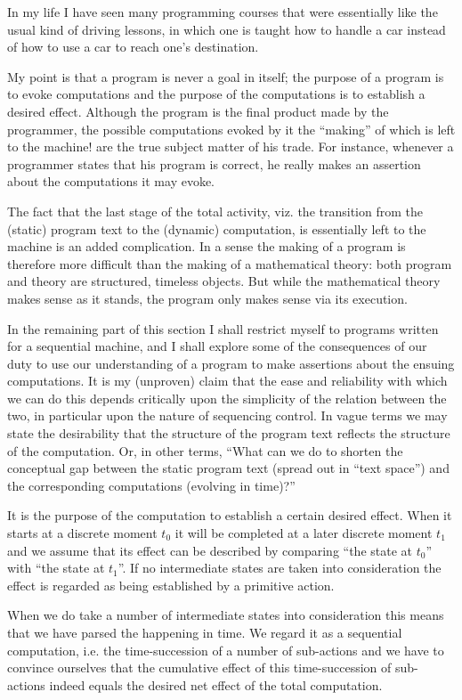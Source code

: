 In my life I have seen many programming courses that were essentially like the usual kind of driving lessons, in which one is taught how to handle a car
instead of how to use a car to reach one's destination.

My point is that a program is never a goal in itself; the purpose of a program is to evoke computations and the purpose of the computations is to establish a desired effect. Although the program is the final product made by the programmer, the possible computations evoked by it \textemdash{}  the ``making'' of which is left to the machine! \textemdash{}  are the true subject matter of his trade. For instance, whenever a programmer states that his program is correct, he really makes an assertion about the computations it may evoke.

The fact that the last stage of the total activity, viz. the transition from the (static) program text to the (dynamic) computation, is essentially left to the machine is an added complication. In a sense the making of a program is therefore more difficult than the making of a mathematical theory: both program and theory are structured, timeless objects. But while the mathematical theory makes sense as it stands, the program only makes sense via its execution.

In the remaining part of this section I shall restrict myself to programs written for a sequential machine, and I shall explore some of the consequences of our duty to use our understanding of a program to make assertions about the ensuing computations. It is my (unproven) claim that the ease and reliability with which we can do this depends critically upon the simplicity of the relation between the two, in particular upon the nature of sequencing control. In vague terms we may state the desirability that the structure of the program text reflects the structure of the computation. Or, in other terms, ``What can we do to shorten the conceptual gap between the static program
text (spread out in ``text space'') and the corresponding computations (evolving in time)?''

It is the purpose of the computation to establish a certain desired effect. When it starts at a discrete moment $t_0$ it will be completed at a later discrete moment $t_1$ and we assume that its effect can be described by comparing ``the state at $t_0$'' with ``the state at $t_1$''. If no intermediate states are taken into consideration the effect is regarded as being established by a primitive action.

When we do take a number of intermediate states into consideration this means that we have parsed the happening in time. We regard it as a sequential computation, i.e. the time-succession of a number of sub-actions and we have to convince ourselves that the cumulative effect of this time-succession of sub-actions indeed equals the desired net effect of the total computation.

